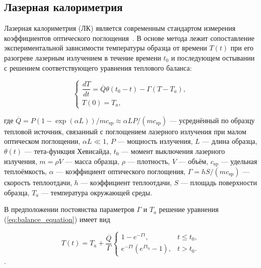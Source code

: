 \subsection{Лазерная калориметрия}

Лазерная калориметрия (ЛК) является современным стандартом измерения коэффициентов оптического поглощения~\cite{iso}. В основе метода лежит сопоставление экспериментальной зависимости температуры образца от времени $T(t)$ при его разогреве лазерным излучением в течение времени $t_0$ и последующем остывании с решением соответствующего уравнения теплового баланса:

\begin{equation}
	\begin{cases}
		\dfrac{d T}{d t} = \overline{Q}\theta(t_0 - t) - \Gamma(T - T_a), \\
		T(0) = T_a,
	\end{cases}
	\label{eq:balance_equation}
\end{equation}



где $\overline{Q} = P(1 - \exp(\alpha L))/mc_{\text{sp}} \approx \alpha LP/(mc_{\text{sp}})$ --- усреднённый по образцу тепловой источник, связанный с поглощением лазерного излучения при малом оптическом поглощении, $\alpha L \ll 1$, $P$ --- мощность излучения, $L$ --- длина образца, $\theta(t)$ --- тета-функция Хевисайда, $t_0$ --- момент выключения лазерного излучения, $m = \rho V$ --- масса образца, $\rho$ --- плотность, $V$ --- объём, $c_{\text{sp}}$ --- удельная теплоёмкость, $\alpha$ --- коэффициент оптического поглощения, $\Gamma = hS/(mc_{\text{sp}})$ --- скорость теплоотдачи, $h$ --- коэффициент теплоотдачи, $S$ --- площадь поверхности образца, $T_a$ --- температура окружающей среды.



В предположении постоянства параметров $\Gamma$ и $T_a$ решение уравнения (\ref{eq:balance_equation}) имеет вид

\begin{equation}
	T(t) = T_a + \frac{\overline{Q}}{\Gamma}
	\begin{cases}
		1 - e^{-\Gamma t}, & t \leq t_0, \\
		e^{-\Gamma t}(e^{\Gamma t_0} - 1), & t > t_0.
	\end{cases}
	\label{eq:balance_equation_solution}
\end{equation}.
